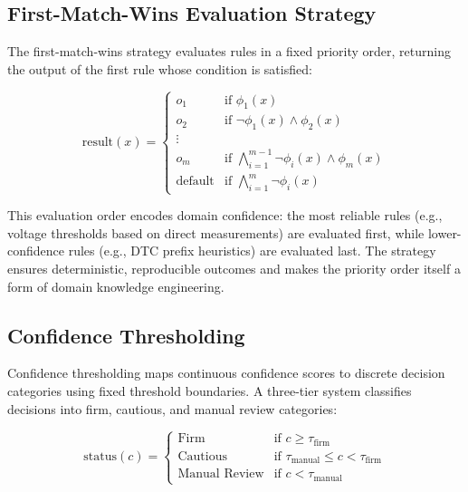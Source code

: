 \documentclass[10pt,a4paper]{article}
\begin{document}
\subsection{First-Match-Wins Evaluation Strategy}
\label{sec:first-match-wins}

The first-match-wins strategy evaluates rules in a fixed priority order, returning the output of the first rule whose condition is satisfied:

\begin{equation}
\text{result}(x) = \begin{cases}
o_1 & \text{if } \phi_1(x) \\
o_2 & \text{if } \neg\phi_1(x) \land \phi_2(x) \\
\vdots & \\
o_m & \text{if } \bigwedge_{i=1}^{m-1} \neg\phi_i(x) \land \phi_m(x) \\
\text{default} & \text{if } \bigwedge_{i=1}^{m} \neg\phi_i(x)
\end{cases}
\label{eq:first-match}
\end{equation}

This evaluation order encodes domain confidence: the most reliable rules (e.g., voltage thresholds based on direct measurements) are evaluated first, while lower-confidence rules (e.g., DTC prefix heuristics) are evaluated last. The strategy ensures deterministic, reproducible outcomes and makes the priority order itself a form of domain knowledge engineering.

\subsection{Confidence Thresholding}
\label{sec:confidence-thresholding}

Confidence thresholding maps continuous confidence scores to discrete decision categories using fixed threshold boundaries. A three-tier system classifies decisions into firm, cautious, and manual review categories:

\begin{equation}
\text{status}(c) = \begin{cases}
\text{Firm} & \text{if } c \geq \tau_{\text{firm}} \\
\text{Cautious} & \text{if } \tau_{\text{manual}} \leq c < \tau_{\text{firm}} \\
\text{Manual Review} & \text{if } c < \tau_{\text{manual}}
\end{cases}
\label{eq:thresholding}
\end{equation}
\end{document}

